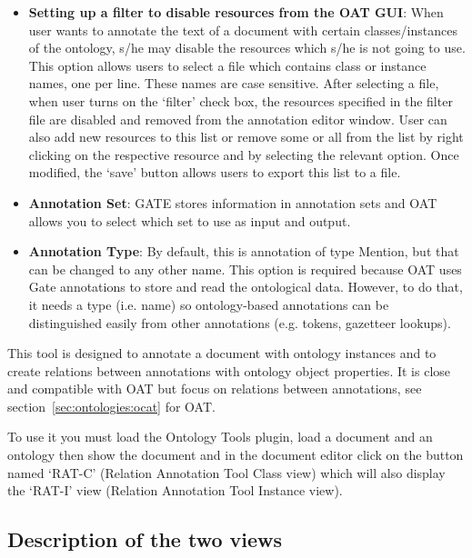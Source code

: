 {\begin{itemize}
\item {\bf Setting up a filter to disable resources from the OAT GUI}: When
user wants to annotate the text of a document with certain
classes/instances of the ontology, s/he may disable the resources
which s/he is not going to use.  This option allows users to select a
file which contains class or instance names, one per line.  These
names are case sensitive.  After selecting a file, when user turns on
the `filter' check box, the resources specified in the filter file
are disabled and removed from the annotation editor window. User can
also add new resources to this list or remove some or all from the
list by right clicking on the respective resource and by selecting the
relevant option.  Once modified, the `save' button allows users to
export this list to a file.

\item {\bf Annotation Set}: GATE stores information in annotation
sets and OAT allows you to select which set to use as input and
output.

\item {\bf Annotation Type}: By default, this is annotation of type
Mention, but that can be changed to any other name. This option is
required because OAT uses Gate annotations to store and read the
ontological data. However, to do that, it needs a type (i.e. name) so
ontology-based annotations can be distinguished easily from other
annotations (e.g. tokens, gazetteer lookups).

\end{itemize}


This tool is designed to annotate a document with ontology instances and to
create relations between annotations with ontology object properties. It is
close and compatible with OAT but focus on relations between annotations, see
section~\ref{sec:ontologies:ocat} for OAT.

To use it you must load the Ontology Tools plugin, load a document and an
ontology then show the document and in the document editor click on the
button named `RAT-C' (Relation Annotation Tool Class view) which will also
display the `RAT-I' view (Relation Annotation Tool Instance view).

\subsection{Description of the two views}

}
